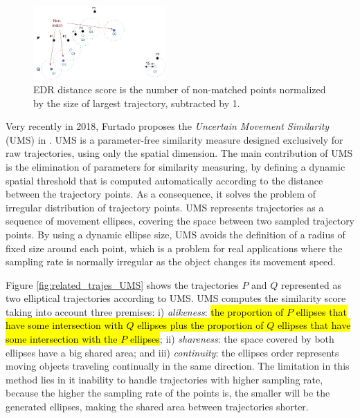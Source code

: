 \begin{figure}[h]
\centering
\includegraphics[width=0.45\textwidth]{Related_Works/related_trajes-EDR.jpg}
\caption{\label{fig:related_trajes_EDR}EDR distance score is the number of non-matched points normalized by the size of largest trajectory, subtracted by 1.}
\end{figure}

Very recently in 2018, Furtado proposes the \emph{Uncertain Movement Similarity} (UMS) in \cite{Furtado-UMS-2018}. UMS is a parameter-free similarity measure designed exclusively for raw trajectories, using only the spatial dimension. The main contribution of UMS is the elimination of parameters for similarity measuring, by defining a dynamic spatial threshold that is computed automatically according to the distance between the trajectory points. As a consequence, it solves the problem of irregular distribution of trajectory points. UMS represents trajectories as a sequence of movement ellipses, covering the space between two sampled trajectory points.
By using a dynamic ellipse size,  UMS avoids the definition of a radius of fixed size around each point, which is a problem for real applications where the sampling rate is normally irregular as the object changes its movement speed.

Figure \ref{fig:related_trajes_UMS} shows the trajectories $P$ and $Q$ represented as two elliptical trajectories according to UMS. UMS computes the similarity score taking into account three premises: i) \textit{alikeness}: \hl{the proportion of $P$ ellipses that have some intersection with $Q$ ellipses plus the proportion of $Q$ ellipses that have some intersection with the $P$ ellipses}; ii) \textit{shareness}: the space covered by both ellipses have a big shared area; and iii) \textit{continuity}: the ellipses order represents moving objects traveling continually in the same direction. The limitation in this method lies in it inability to handle trajectories with higher sampling rate, because the higher the sampling rate of the points is, the smaller will be the generated ellipses, making the shared area between trajectories shorter.

